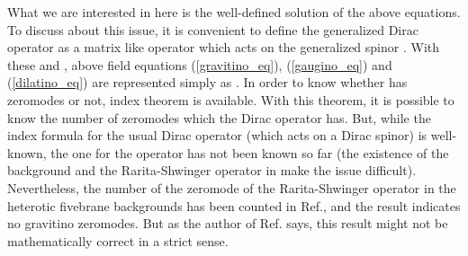 \documentclass[a4paper,aps, amssymb, preprint, 12pt]{revtex4}
\begin{document}
What we are interested in here is the well-defined solution of the above equations.
To discuss about this issue, it is convenient to define the generalized Dirac operator \coordHE{} as a \coordHE{} matrix like operator which acts on the generalized spinor \coordHE{}.
With these \coordHE{} and \myHighlight{$\Psi$}\coordHE{}, above field equations (\ref{gravitino_eq}), (\ref{gaugino_eq}) and (\ref{dilatino_eq}) are represented simply as \coordHE{}.
In order to know whether \coordHE{} has zeromodes or not, index theorem is available.
With this theorem, it is possible to know the number of zeromodes which the Dirac operator has.
But, while the index formula for the usual Dirac operator (which acts on a Dirac spinor) is well-known\cite{APS}, the one for the operator \coordHE{} has not been known so far (the existence of the background \coordHE{} and the Rarita-Shwinger operator in \coordHE{} make the issue difficult).
Nevertheless, the number of the zeromode of the Rarita-Shwinger operator in the heterotic fivebrane  backgrounds has been counted in Ref.\cite{Bellisai}, and the result indicates no gravitino zeromodes.
But as the author of Ref.\cite{Bellisai} says, this result might not be mathematically correct in a strict sense.
\end{document}

